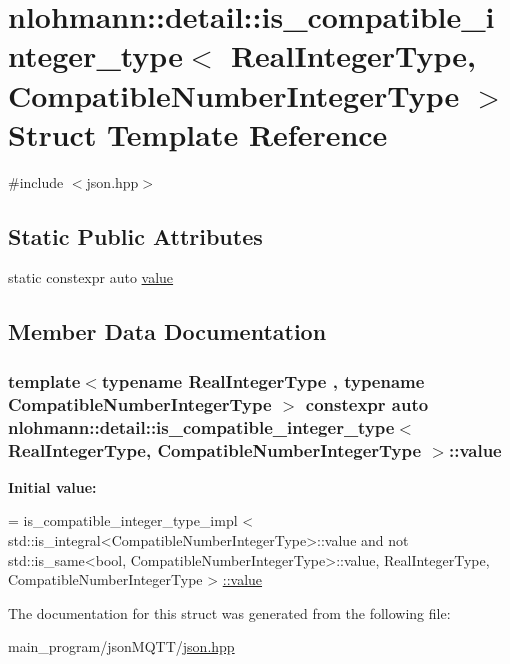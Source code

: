 \hypertarget{structnlohmann_1_1detail_1_1is__compatible__integer__type}{}\section{nlohmann\+:\+:detail\+:\+:is\+\_\+compatible\+\_\+integer\+\_\+type$<$ Real\+Integer\+Type, Compatible\+Number\+Integer\+Type $>$ Struct Template Reference}
\label{structnlohmann_1_1detail_1_1is__compatible__integer__type}


{\ttfamily \#include $<$json.\+hpp$>$}

\subsection*{Static Public Attributes}
\begin{DoxyCompactItemize}
\item 
static constexpr auto \hyperlink{structnlohmann_1_1detail_1_1is__compatible__integer__type_ac5e5bd39773676564c73d3dd2a9c6e0a}{value}
\end{DoxyCompactItemize}


\subsection{Member Data Documentation}
\subsubsection[{\texorpdfstring{value}{value}}]{\setlength{\rightskip}{0pt plus 5cm}template$<$typename Real\+Integer\+Type , typename Compatible\+Number\+Integer\+Type $>$ constexpr auto {\bf nlohmann\+::detail\+::is\+\_\+compatible\+\_\+integer\+\_\+type}$<$ Real\+Integer\+Type, Compatible\+Number\+Integer\+Type $>$\+::value\hspace{0.3cm}{\ttfamily [static]}}\hypertarget{structnlohmann_1_1detail_1_1is__compatible__integer__type_ac5e5bd39773676564c73d3dd2a9c6e0a}{}\label{structnlohmann_1_1detail_1_1is__compatible__integer__type_ac5e5bd39773676564c73d3dd2a9c6e0a}
{\bfseries Initial value\+:}
\begin{DoxyCode}
=
        is\_compatible\_integer\_type\_impl <
        std::is\_integral<CompatibleNumberIntegerType>::value and
        not std::is\_same<bool, CompatibleNumberIntegerType>::value,
        RealIntegerType, CompatibleNumberIntegerType > \hyperlink{structnlohmann_1_1detail_1_1is__compatible__integer__type_ac5e5bd39773676564c73d3dd2a9c6e0a}{::value}
\end{DoxyCode}


The documentation for this struct was generated from the following file\+:\begin{DoxyCompactItemize}
\item 
main\+\_\+program/json\+M\+Q\+T\+T/\hyperlink{json_8hpp}{json.\+hpp}\end{DoxyCompactItemize}
